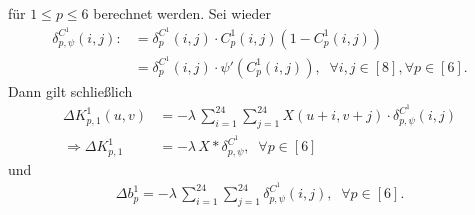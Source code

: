 für $1 \leq p \leq 6$ berechnet werden. Sei wieder
\begin{align*}
    \delta^{C^1}_{p,\psi}(i,j):&= \delta^{C^1}_p(i,j) \cdot C_p^1(i,j)\left(1- C_p^1(i,j)\right)\\
    &= \delta^{C^1}_p(i,j) \cdot \psi'(C^1_p(i,j)), \; \; \forall i,j \in [8], \forall p \in [6].
\end{align*}
Dann gilt schließlich
\begin{align*}
    \Delta K^1_{p,1}(u,v) &= - \lambda \, \sum_{i=1}^{24} \sum_{j=1}^{24} X(u+i,v+j) \cdot \delta^{C^1}_{p,\psi}(i,j) \\
     \Rightarrow \Delta K_{p,1}^1 &=- \lambda \, X \ast \delta^{C^1}_{p,\psi} , \; \; \forall p \in [6]
\end{align*} und 
\begin{align*}
    \Delta b_p^1 =-\lambda \, \sum_{i=1}^{24} \sum_{j=1}^{24} \delta_{p, \psi}^{C^1}(i,j), \; \; \forall p \in[6].
\end{align*}


